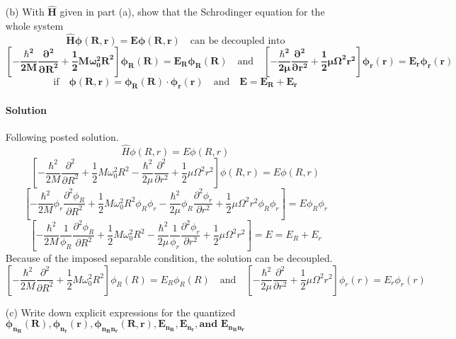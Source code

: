 \documentclass{article}
\begin{document}
{\begin{enumerate}
\[		\]
		\[
			\frac{\partial^2}{\partial R^2} \left[ \frac{m_1}{M^2} \right] + \frac{1}{m_1} \frac{\partial^2}{\partial r^2} + \frac{\partial^2}{\partial R^2} \left[ \frac{m_2}{M^2} \right] + \frac{1}{m_2} \frac{\partial^2}{\partial r^2}
		\]
		\[
			\frac{\partial^2}{\partial R^2} \left[ \frac{m_1}{M^2} + \frac{m_2}{M^2} \right] + \frac{\partial^2}{\partial r^2} \left[ \frac{1}{m_1} + \frac{1}{m_2} \right]
		\]
		\[
			\frac{\partial^2}{\partial R^2} \left[ \frac{m_1 + m_2}{M^2} \right] + \frac{\partial^2}{\partial r^2} \left[ \frac{m_2 + m_1}{m_1 m_2} \right]
		\]
		\[
			\frac{1}{M} \frac{\partial^2}{\partial R^2} + \frac{1}{\mu} \frac{\partial^2}{\partial r^2}
		\]
		\clearpage
		\[
			m_1 x_1^2 + m_2 x_2^2
		\]
		\[
			x_1(m_1 x_1) + x_2(m_2 x_2)
		\]
		\[
			x_1\left(M\mu \frac{x_1}{m_2}\right) + x_2\left(M\mu \frac{x_2}{m_1}\right)
		\]
		\[
			M\mu \left[\frac{x^2_1}{m_2} + \frac{x^2_2}{m_1}\right]
		\]
		\[
			M\mu \left[\frac{x^2_1}{m_2} + \frac{x^2_2}{m_1}\right]
		\]
		\[
			M\mu \left[\frac{m_1 x^2_1 + m_2 x_2 ^2}{m_1 m_2}\right]
		\]
		\item [(b)] With $\bm{\hat{H}}$ given in part (a), show that the Schrodinger equation for the whole system
		\[
			\bm{\hat{H} \phi(R,r) = E \phi(R,r)} \quad \text{can be decoupled into}
		\]
		\[
			\bm{\left[-\frac{\hbar^2}{2M} \frac{\partial^2}{\partial R^2} + \frac{1}{2} M \omega^2_0 R^2\right] \phi_R(R) = E_R \phi_R(R)}
			\quad \text{and} \quad
			\bm{\left[-\frac{\hbar^2}{2\mu} \frac{\partial^2}{\partial r^2} + \frac{1}{2} \mu \Omega^2 r^2\right] \phi_r(r) = E_r \phi_r(r) }
		\]
		\[
			\text{if} \quad \bm{\phi(R,r) = \phi_R(R) \cdot \phi_r(r)} \quad \text{and} \quad \bm{E=E_R + E_r}
		\]
		\paragraph{Solution} Following posted solution.
		\[
			\hat{H}\phi(R,r) = E\phi(R,r)
		\]
		\[
			\left[-\frac{\hbar^2}{2M} \frac{\partial^2}{\partial R^2} + \frac{1}{2} M \omega^2_0 R^2 - \frac{\hbar^2}{2\mu} \frac{\partial^2}{\partial r^2} + \frac{1}{2} \mu \Omega^2 r^2\right] \phi(R,r)  = E\phi(R,r)
		\]
		\[
			\left[-\frac{\hbar^2}{2M} \phi_r \frac{\partial^2\phi_R}{\partial R^2} + \frac{1}{2} M \omega^2_0 R^2 \phi_R \phi_r - \frac{\hbar^2}{2\mu} \phi_R \frac{\partial^2\phi_r}{\partial r^2} + \frac{1}{2} \mu \Omega^2 r^2 \phi_R \phi_r \right]  = E\phi_R \phi_r
		\]
		\[
			\left[-\frac{\hbar^2}{2M} \frac{1}{\phi_R} \frac{\partial^2\phi_R}{\partial R^2} + \frac{1}{2} M \omega^2_0 R^2 - \frac{\hbar^2}{2\mu} \frac{1}{\phi_r} \frac{\partial^2\phi_r}{\partial r^2} + \frac{1}{2} \mu \Omega^2 r^2 \right]  = E = E_R + E_r
		\]
		Because of the imposed separable condition, the solution can be decoupled.
		\[
			\left[-\frac{\hbar^2}{2M} \frac{\partial^2}{\partial R^2} + \frac{1}{2} M \omega^2_0 R^2\right] \phi_R(R) = E_R \phi_R(R)
			\quad \text{and} \quad
			\left[-\frac{\hbar^2}{2\mu} \frac{\partial^2}{\partial r^2} + \frac{1}{2} \mu \Omega^2 r^2\right] \phi_r(r) = E_r \phi_r(r)
		\]
		\item[(c)] Write down explicit expressions for the quantized $\bm{\phi_{n_R}(R), \phi_{n_r}(r), \phi_{n_R n_r}(R,r), E_{n_R}, E_{n_r}, \text{and } E_{n_R n_r}}$

\end{enumerate}}
\end{document}

